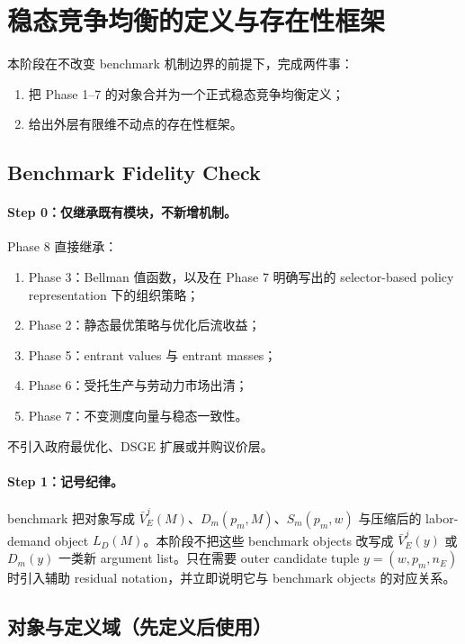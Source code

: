 \section{稳态竞争均衡的定义与存在性框架}

本阶段在不改变 benchmark 机制边界的前提下，完成两件事：
\begin{enumerate}
    \item 把 Phase 1--7 的对象合并为一个正式稳态竞争均衡定义；
    \item 给出外层有限维不动点的存在性框架。
\end{enumerate}

\subsection{Benchmark Fidelity Check}

\paragraph{Step 0：仅继承既有模块，不新增机制。}
Phase 8 直接继承：
\begin{enumerate}
    \item Phase 3：Bellman 值函数，以及在 Phase 7 明确写出的 selector-based policy representation 下的组织策略；
    \item Phase 2：静态最优策略与优化后流收益；
    \item Phase 5：entrant values 与 entrant masses；
    \item Phase 6：受托生产与劳动力市场出清；
    \item Phase 7：不变测度向量与稳态一致性。
\end{enumerate}
不引入政府最优化、DSGE 扩展或并购议价层。

\paragraph{Step 1：记号纪律。}
benchmark 把对象写成 $\bar V_E^j(M)$、$D_m(p_m,M)$、$S_m(p_m,w)$ 与压缩后的 labor-demand object $L_D(M)$。本阶段不把这些 benchmark objects 改写成 $\bar V_E^j(y)$ 或 $D_m(y)$ 一类新 argument list。只在需要 outer candidate tuple $y=(w,p_m,n_E)$ 时引入辅助 residual notation，并立即说明它与 benchmark objects 的对应关系。

\subsection{对象与定义域（先定义后使用）}

